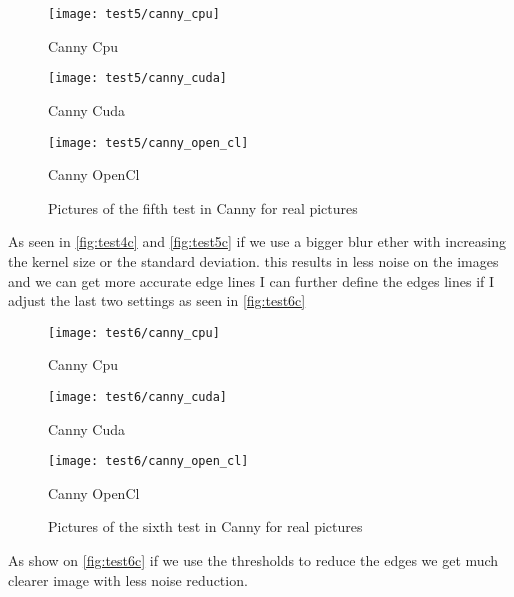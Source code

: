 \begin{figure}[H]
\centering
\begin{minipage}[t]{.325\textwidth}
\centering
\texttt{[image: test5/canny\_cpu]}
\addtocounter{figure}{-1}
\captionsetup{labelformat=empty}
\caption[]{Canny Cpu}
\end{minipage}
\begin{minipage}[t]{.325\textwidth}
\centering
\texttt{[image: test5/canny\_cuda]}
\addtocounter{figure}{-1}
\captionsetup{labelformat=empty}
\caption[]{Canny Cuda}
\end{minipage}
\begin{minipage}[t]{.325\textwidth}
\centering
\texttt{[image: test5/canny\_open\_cl]}
\addtocounter{figure}{-1}
\captionsetup{labelformat=empty}
\caption[]{Canny OpenCl}
\end{minipage}
\caption{Pictures of the fifth test in \ac{Canny} for real pictures}
\label{fig:test5c}
\end{figure}

As seen in \autoref{fig:test4c} and \autoref{fig:test5c} if we use a bigger blur ether with increasing the kernel size or the standard deviation. this results in less noise on the images and we can get more accurate edge lines I can further define the edges lines if I adjust the last two settings as seen in \autoref{fig:test6c}

\begin{figure}[H]
\centering
\begin{minipage}[t]{.325\textwidth}
\centering
\texttt{[image: test6/canny\_cpu]}
\addtocounter{figure}{-1}
\captionsetup{labelformat=empty}
\caption[]{Canny Cpu}
\end{minipage}
\begin{minipage}[t]{.325\textwidth}
\centering
\texttt{[image: test6/canny\_cuda]}
\addtocounter{figure}{-1}
\captionsetup{labelformat=empty}
\caption[]{Canny Cuda}
\end{minipage}
\begin{minipage}[t]{.325\textwidth}
\centering
\texttt{[image: test6/canny\_open\_cl]}
\addtocounter{figure}{-1}
\captionsetup{labelformat=empty}
\caption[]{Canny OpenCl}
\end{minipage}
\caption{Pictures of the sixth test in \ac{Canny} for real pictures}
\label{fig:test6c}
\end{figure}

As show on \autoref{fig:test6c} if we use the thresholds to reduce the edges we get much clearer image with less noise reduction.

